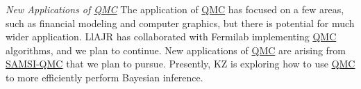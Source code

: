 \documentclass[11pt]{NSFamsart}
\newcommand{\QMC}{\hyperlink{QMClink}{QMC}\xspace}
\newcommand{\SAMSIQMC}{\hyperlink{SAMSIlink}{SAMSI-QMC}\xspace}
\begin{document}
\emph{New Applications of \QMC}
The application of \QMC has focused on a few areas, such as financial modeling and computer 
graphics, but there is 
potential for much wider application.  LlAJR has collaborated with Fermilab implementing \QMC 
algorithms, and we plan to continue.    New applications of \QMC are arising from \SAMSIQMC that 
we plan to pursue.  Presently, KZ is exploring how to use \QMC to more efficiently perform Bayesian 
inference.



\newpage
\clearpage
\setcounter{page}{1}




{\renewcommand\addcontentsline[3]{} 
\renewcommand{\refname}{{\Large\textbf{References Cited}}}                   %
\renewcommand{\bibliofont}{\normalsize}

}
\end{document}
